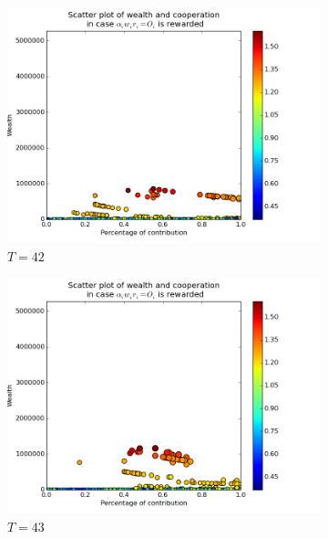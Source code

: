 \documentclass{article}
\begin{document}
\begin{figure}[h]
\begin{subfigure}[t]{0.333\textwidth}
\centering
\includegraphics[width=\textwidth]{nq_output_scatter/scatter_ranking_1_042.png}
\caption{$T = 42$}
\end{subfigure}%
%
\hfill
%
\begin{subfigure}[t]{0.333\textwidth}
\centering
\includegraphics[width=\textwidth]{nq_output_scatter/scatter_ranking_1_043.png}
\caption{$T = 43$}
\end{subfigure}%
%
\hfill
%
\begin{subfigure}[t]{0.333\textwidth}
\centering

\end{subfigure}
\end{figure}
\end{document}
